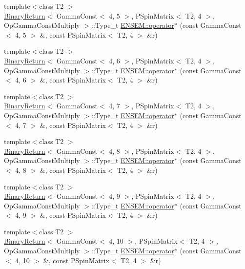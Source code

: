 \begin{DoxyCompactItemize}
{\footnotesize template$<$class T2 $>$ }\\\mbox{\hyperlink{structBinaryReturn}{Binary\+Return}}$<$ Gamma\+Const$<$ 4, 5 $>$, P\+Spin\+Matrix$<$ T2, 4 $>$, Op\+Gamma\+Const\+Multiply $>$\+::Type\+\_\+t \mbox{\hyperlink{group__primspinmatrix_ga1fbaa359542d933fd3150bbcdf5006d5}{E\+N\+S\+E\+M\+::operator$\ast$}} (const Gamma\+Const$<$ 4, 5 $>$ \&, const P\+Spin\+Matrix$<$ T2, 4 $>$ \&r)
\item 
{\footnotesize template$<$class T2 $>$ }\\\mbox{\hyperlink{structBinaryReturn}{Binary\+Return}}$<$ Gamma\+Const$<$ 4, 6 $>$, P\+Spin\+Matrix$<$ T2, 4 $>$, Op\+Gamma\+Const\+Multiply $>$\+::Type\+\_\+t \mbox{\hyperlink{group__primspinmatrix_ga6159ef586816bd93e368fd7d18f601ad}{E\+N\+S\+E\+M\+::operator$\ast$}} (const Gamma\+Const$<$ 4, 6 $>$ \&, const P\+Spin\+Matrix$<$ T2, 4 $>$ \&r)
\item 
{\footnotesize template$<$class T2 $>$ }\\\mbox{\hyperlink{structBinaryReturn}{Binary\+Return}}$<$ Gamma\+Const$<$ 4, 7 $>$, P\+Spin\+Matrix$<$ T2, 4 $>$, Op\+Gamma\+Const\+Multiply $>$\+::Type\+\_\+t \mbox{\hyperlink{group__primspinmatrix_ga05f36a58daa404d7245006a9dd7323bb}{E\+N\+S\+E\+M\+::operator$\ast$}} (const Gamma\+Const$<$ 4, 7 $>$ \&, const P\+Spin\+Matrix$<$ T2, 4 $>$ \&r)
\item 
{\footnotesize template$<$class T2 $>$ }\\\mbox{\hyperlink{structBinaryReturn}{Binary\+Return}}$<$ Gamma\+Const$<$ 4, 8 $>$, P\+Spin\+Matrix$<$ T2, 4 $>$, Op\+Gamma\+Const\+Multiply $>$\+::Type\+\_\+t \mbox{\hyperlink{group__primspinmatrix_ga14cbf328548b8d7ab484cf88d9190adf}{E\+N\+S\+E\+M\+::operator$\ast$}} (const Gamma\+Const$<$ 4, 8 $>$ \&, const P\+Spin\+Matrix$<$ T2, 4 $>$ \&r)
\item 
{\footnotesize template$<$class T2 $>$ }\\\mbox{\hyperlink{structBinaryReturn}{Binary\+Return}}$<$ Gamma\+Const$<$ 4, 9 $>$, P\+Spin\+Matrix$<$ T2, 4 $>$, Op\+Gamma\+Const\+Multiply $>$\+::Type\+\_\+t \mbox{\hyperlink{group__primspinmatrix_gaa9f2a3db77b04450fdbceeca87443364}{E\+N\+S\+E\+M\+::operator$\ast$}} (const Gamma\+Const$<$ 4, 9 $>$ \&, const P\+Spin\+Matrix$<$ T2, 4 $>$ \&r)
\item 
{\footnotesize template$<$class T2 $>$ }\\\mbox{\hyperlink{structBinaryReturn}{Binary\+Return}}$<$ Gamma\+Const$<$ 4, 10 $>$, P\+Spin\+Matrix$<$ T2, 4 $>$, Op\+Gamma\+Const\+Multiply $>$\+::Type\+\_\+t \mbox{\hyperlink{group__primspinmatrix_ga6ad402d90ca05be34ec137e28d99fded}{E\+N\+S\+E\+M\+::operator$\ast$}} (const Gamma\+Const$<$ 4, 10 $>$ \&, const P\+Spin\+Matrix$<$ T2, 4 $>$ \&r)

\end{DoxyCompactItemize}
